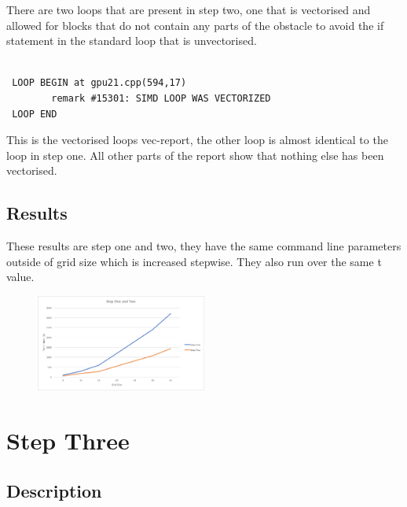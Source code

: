\documentclass[paper=a4, fontsize=11pt]{scrartcl}
\numberwithin{equation}{section}		%
\numberwithin{figure}{section}			%
\numberwithin{table}{section}				%
\begin{document}
There are two loops that are present in step two, one that is vectorised and allowed for blocks that do not contain any parts of the obstacle to avoid the if statement in the standard loop that is unvectorised. 

\begin{lstlisting}

 LOOP BEGIN at gpu21.cpp(594,17)
		remark #15301: SIMD LOOP WAS VECTORIZED
 LOOP END

\end{lstlisting}

This is the vectorised loops vec-report, the other loop is almost identical to the loop in step one. All other parts of the report show that nothing else has been vectorised.

\subsection{Results}

These results are step one and two, they have the same command line parameters outside of grid size which is increased stepwise. They also run over the same t value.

\begin{figure}[h]
\centering
\includegraphics[width=0.5\textwidth]{StepTwo.png}
\end{figure}


\section{Step Three}
\subsection{Description}
\end{document}
